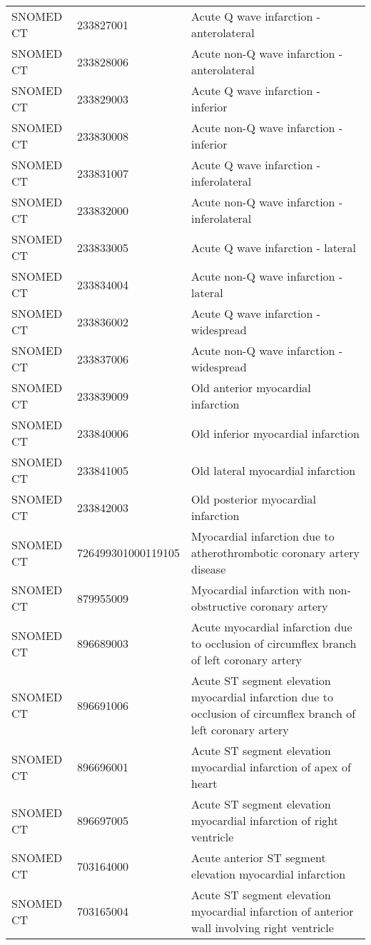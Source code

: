 \begin{longtable}{p{}p{}p{}}
  SNOMED CT & 233827001 & Acute Q wave infarction - anterolateral \\ 
  SNOMED CT & 233828006 & Acute non-Q wave infarction - anterolateral \\ 
  SNOMED CT & 233829003 & Acute Q wave infarction - inferior \\ 
  SNOMED CT & 233830008 & Acute non-Q wave infarction - inferior \\ 
  SNOMED CT & 233831007 & Acute Q wave infarction - inferolateral \\ 
  SNOMED CT & 233832000 & Acute non-Q wave infarction - inferolateral \\ 
  SNOMED CT & 233833005 & Acute Q wave infarction - lateral \\ 
  SNOMED CT & 233834004 & Acute non-Q wave infarction - lateral \\ 
  SNOMED CT & 233836002 & Acute Q wave infarction - widespread \\ 
  SNOMED CT & 233837006 & Acute non-Q wave infarction - widespread \\ 
  SNOMED CT & 233839009 & Old anterior myocardial infarction \\ 
  SNOMED CT & 233840006 & Old inferior myocardial infarction \\ 
  SNOMED CT & 233841005 & Old lateral myocardial infarction \\ 
  SNOMED CT & 233842003 & Old posterior myocardial infarction \\ 
  SNOMED CT & 726499301000119105 & Myocardial infarction due to atherothrombotic coronary artery disease \\ 
  SNOMED CT & 879955009 & Myocardial infarction with non-obstructive coronary artery \\ 
  SNOMED CT & 896689003 & Acute myocardial infarction due to occlusion of circumflex branch of left coronary artery \\ 
  SNOMED CT & 896691006 & Acute ST segment elevation myocardial infarction due to occlusion of circumflex branch of left coronary artery \\ 
  SNOMED CT & 896696001 & Acute ST segment elevation myocardial infarction of apex of heart \\ 
  SNOMED CT & 896697005 & Acute ST segment elevation myocardial infarction of right ventricle \\ 
  SNOMED CT & 703164000 & Acute anterior ST segment elevation myocardial infarction \\ 
  SNOMED CT & 703165004 & Acute ST segment elevation myocardial infarction of anterior wall involving right ventricle \\ 

\end{longtable}
